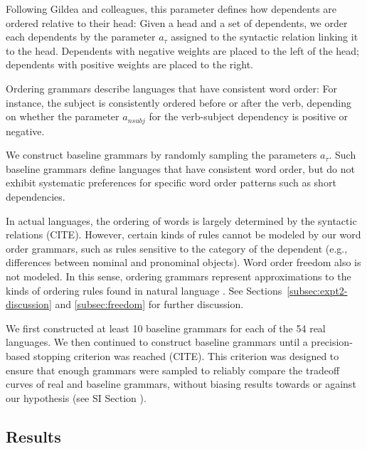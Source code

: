 Following Gildea and colleagues, this parameter defines how dependents are ordered relative to their head:
Given a head and a set of dependents, we order each dependents by the parameter $a_\tau$ assigned to the syntactic relation linking it to the head.
Dependents with negative weights are placed to the left of the head; dependents with positive weights are placed to the right.

Ordering grammars describe languages that have consistent word order:
For instance, the subject is consistently ordered before or after the verb, depending on whether the parameter $a_{nsubj}$ for the verb-subject dependency is positive or negative.

We construct baseline grammars by randomly sampling the parameters $a_\tau$.
Such baseline grammars define languages that have consistent word order, but do not exhibit systematic preferences for specific word order patterns such as short dependencies.


In actual languages, the ordering of words is largely determined by the syntactic relations (CITE).
However, certain kinds of rules cannot be modeled by our word order grammars, such as rules sensitive to the category of the dependent (e.g., differences between nominal and pronominal objects).
Word order freedom also is not modeled.
In this sense, ordering grammars represent approximations to the kinds of ordering rules found in natural language \citep{gildea-optimizing-2007, gildea-grammars-2010, gildea-human-2015}.
See Sections~\ref{subsec:expt2-discussion} and \ref{subsec:freedom} for further discussion.


We first constructed at least 10 baseline grammars for each of the 54 real languages.
We then continued to construct baseline grammars until a precision-based stopping criterion was reached (CITE). This criterion was designed to ensure that enough grammars were sampled to reliably compare the tradeoff curves of real and baseline grammars, without biasing results towards or against our hypothesis (see SI Section \REF).

\subsection{Results}\label{sec:main-experiment-results}


